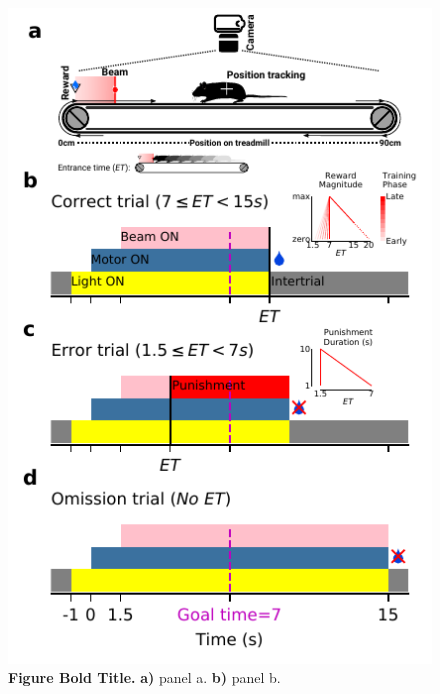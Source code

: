 \begin{figure}[bt!]
  \begin{center}
    \includegraphics[width=.4\linewidth]{figures/TaskRulesFULL.pdf}
    \caption[Figure Caption]
    {\textbf{Figure Bold Title.}
      \textbf{a)}
        panel a.
      \textbf{b)}
        panel b.
    }
    \label{fig-taskRules}
  \end{center}
\end{figure}